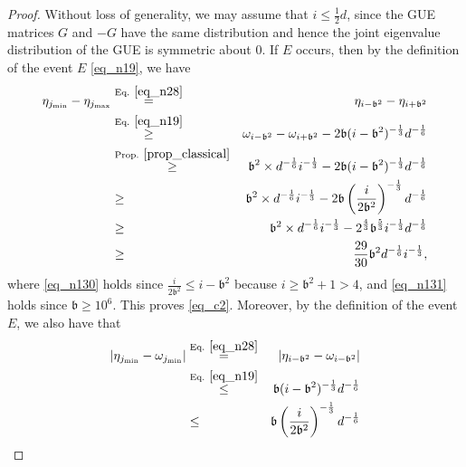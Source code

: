\documentclass[11pt,letterpaper]{article}
\begin{document}
\begin{proof}
Without loss of generality, we may assume that 
%
$i \leq \frac{1}{2}d$,  since the GUE matrices $G$ and $-G$ have the same distribution and hence the joint eigenvalue distribution of the GUE is symmetric about $0$.
%
If $E$ occurs, then by the definition of the event $E$ \eqref{eq_n19}, we have
%
%
%
\begin{eqnarray}
 \eta_{j_{\mathrm{min}}} - \eta_{j_{\mathrm{max}}} 
  & \stackrel{\textrm{Eq. } \eqref{eq_n28}}{=} &
    \eta_{i- \mathfrak{b}^2} - \eta_{i+ \mathfrak{b}^2} \nonumber\\
    &\stackrel{\textrm{Eq. } \eqref{eq_n19}}{\geq} &    \omega_{i- \mathfrak{b}^2} - \omega_{i+ \mathfrak{b}^2} - 2\mathfrak{b} (i-\mathfrak{b}^2)^{-\frac{1}{3}} d^{-\frac{1}{6}} \nonumber\\
    & \stackrel{\textrm{Prop. } \ref{prop_classical}}{\geq}& \mathfrak{b}^2 \times  d^{-\frac{1}{6}} i^{-\frac{1}{3}} - 2\mathfrak{b} (i-\mathfrak{b}^2)^{-\frac{1}{3}} d^{-\frac{1}{6}} \nonumber\\
        & \geq &\mathfrak{b}^2 \times  d^{-\frac{1}{6}} i^{-\frac{1}{3}} - 2\mathfrak{b} \left(\frac{i}{2\mathfrak{b}^2}\right)^{-\frac{1}{3}} d^{-\frac{1}{6}} \label{eq_n130}\\
         & \geq &\mathfrak{b}^2 \times  d^{-\frac{1}{6}} i^{-\frac{1}{3}} -  2^{\frac{4}{3}}\mathfrak{b}^{\frac{5}{3}} i^{-\frac{1}{3}} d^{-\frac{1}{6}} \nonumber\\
         &\geq & \frac{29}{30} \mathfrak{b}^2 d^{-\frac{1}{6}} i^{-\frac{1}{3}}, \label{eq_n131}
%
\end{eqnarray}
%
where \eqref{eq_n130} holds since $\frac{i}{2\mathfrak{b}^2} \leq i-\mathfrak{b}^2$ because $i \geq \mathfrak{b}^2 +1 > 4$, and \eqref{eq_n131} holds since $\mathfrak{b} \geq 10^6$.
%
This proves \eqref{eq_c2}.
%
Moreover, by the definition of the event $E$, we also have that 
%
\begin{eqnarray}
   |\eta_{j_{\mathrm{min}}} -  \omega_{j_{\mathrm{min}}}| 
   &\stackrel{\textrm{Eq. } \eqref{eq_n28}}{=} & |\eta_{i- \mathfrak{b}^2} -  \omega_{i- \mathfrak{b}^2}| \nonumber\\ &\stackrel{\textrm{Eq. } \eqref{eq_n19}}{\leq}&   \mathfrak{b} (i-\mathfrak{b}^2)^{-\frac{1}{3}} d^{-\frac{1}{6}}\nonumber\\
    &\leq & \mathfrak{b} \left(\frac{i}{2\mathfrak{b}^2}\right)^{-\frac{1}{3}} d^{-\frac{1}{6}} \label{eq_n132}\\

\end{eqnarray}
\end{proof}
\end{document}
